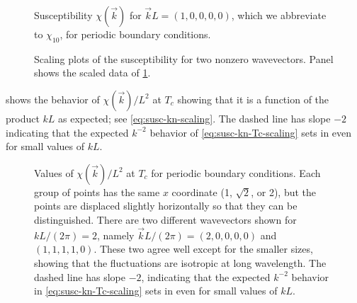 \begin{figure}
  \centering
  
  \caption [
    Wavevector-dependent susceptibility $\chi(\vec{k})$ for $\vec{k} L/(2\pi) =
    (1,0,0,0,0)$ for the five-dimensional Ising model with periodic boundary
    conditions.
  ]
  {
    Susceptibility $\chi(\vec{k})$ for $\vec{k} L = (1,0,0,0,0)$, which we
    abbreviate to $\chi_{10}$, for periodic boundary conditions.
  }
  \label{fig:chi-p-k10}
\end{figure}

\begin{figure}
  \centering
  \begin{subfigure}{0.49\textwidth}
    \centering
    
    \label{fig:chi-k10-scaling}
  \end{subfigure}
  \begin{subfigure}{0.49\textwidth}
    \centering
    
    \label{fig:chi-k110-scaling}
  \end{subfigure}
  \caption[
    Scaling plots of the susceptibility of the $d=5$ periodic Ising model for
    two nonzero wavevectors.
  ]
  {
    Scaling plots of the susceptibility for two nonzero wavevectors. Panel
     shows the scaled data of \cref{fig:chi-p-k10}.
  } \label{fig:chi-p-modes-scaling}
\end{figure}

 shows the behavior of $\chi(\vec{k})/L^2$ at $T_c$
showing that it is a function of the product $k L$ as expected; see
\cref{eq:susc-kn-scaling}. The dashed line has slope $-2$ indicating that the
expected $k^{-2}$ behavior of \cref{eq:susc-kn-Tc-scaling} sets in even for
small values of $k L$.
\begin{figure}
  \centering
  
  \caption[Values of $\chi(\vec{k})/L^2$ at $T_c$ for periodic boundary conditions.]
  {
    Values of $\chi(\vec{k})/L^2$ at $T_c$ for periodic boundary conditions.
    Each group of points has the same $x$ coordinate (1, $\sqrt{2}$, or 2), but
    the points are displaced slightly horizontally so that they can be
    distinguished. There are two different wavevectors shown for $k
    L/(2\pi)=2$, namely $\vec{k}L/(2\pi)=(2,0,0,0,0)$ and $(1,1,1,1,0)$. These
    two agree well except for the smaller sizes, showing that the fluctuations
    are isotropic at long wavelength. The dashed line has slope $-2$,
    indicating that the expected $k^{-2}$ behavior in
    \cref{eq:susc-kn-Tc-scaling} sets in even for small values of $k L$.
  } \label{fig:chi-modes-p-Tc}
\end{figure}


